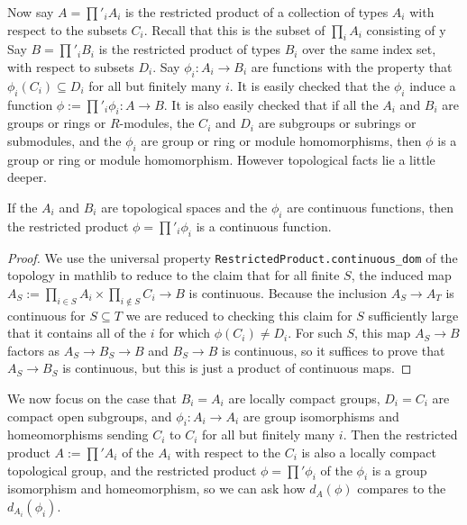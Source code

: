 Now say $A=\prod'_i A_i$ is the restricted product of a collection of types $A_i$
  with respect to the subsets $C_i$. Recall that this is the subset of $\prod_i A_i$
  consisting of y Say $B=\prod'_i B_i$ is the restricted
  product of types $B_i$ over the same index set, with respect to
  subsets $D_i$. Say $\phi_i:A_i\to B_i$ are functions
  with the property that $\phi_i(C_i)\subseteq D_i$ for all but finitely many $i$.
It is easily checked that the $\phi_i$ induce a function $\phi:=\prod'_i\phi_i:A\to B$. It is also easily
checked that if all the $A_i$ and $B_i$ are groups or rings or $R$-modules, the $C_i$ and $D_i$
are subgroups or subrings or submodules,
and the $\phi_i$ are group or ring or module homomorphisms, then $\phi$ is a group or ring or
module homomorphism. However topological facts lie a little deeper.

\begin{lemma}
  \label{Continuous.restrictedProduct_congrRight}
  \leanok
  If the $A_i$ and $B_i$ are topological spaces and the $\phi_i$ are continuous functions,
  then the restricted product $\phi = \prod'_i\phi_i$ is a continuous function.
\end{lemma}
\begin{proof}
  \leanok
  We use the universal property {\tt RestrictedProduct.continuous\_dom} of the
  topology in mathlib to reduce to the claim that for all finite $S$,
  the induced map $A_S:=\prod_{i\in S}A_i\times\prod_{i\notin S}C_i\to B$ is continuous.
  Because the inclusion $A_S\to A_T$ is continuous for $S\subseteq T$ we are reduced
  to checking this claim for $S$ sufficiently large that it contains all of the $i$
  for which $\phi(C_i)\not=D_i$. For such $S$, this map $A_S\to B$ factors as $A_S\to B_S\to B$
  and $B_S\to B$ is continuous, so it suffices to prove that $A_S\to B_S$ is continuous, but
  this is just a product of continuous maps.
\end{proof}

We now focus on the case that $B_i=A_i$ are locally compact groups, $D_i=C_i$ are compact
open subgroups, and $\phi_i:A_i\to A_i$ are group isomorphisms and homeomorphisms sending
$C_i$ to $C_i$ for all but finitely many $i$. Then the restricted product $A:=\prod'A_i$
of the $A_i$ with respect to the $C_i$ is also a locally compact topological group, and the
restricted product $\phi=\prod'\phi_i$ of the $\phi_i$ is a group isomorphism and homeomorphism,
so we can ask how $d_A(\phi)$ compares to the $d_{A_i}(\phi_i)$.

